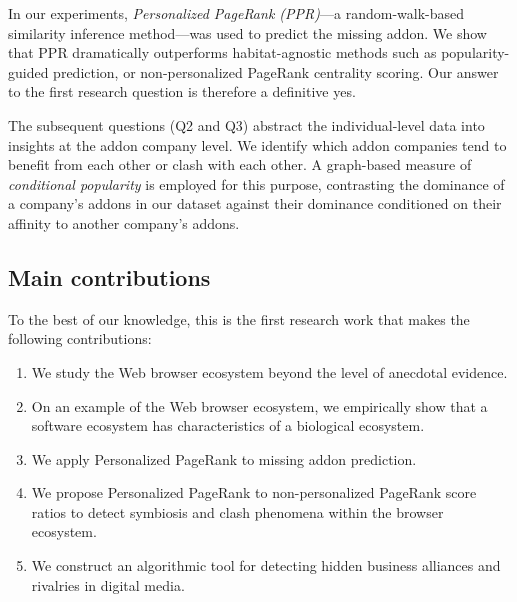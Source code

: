 \documentclass[ijoc,nonblindrev]{informs3} %
\numberwithin{equation}{subsection}
\begin{document}
In our experiments, \emph{Personalized PageRank (PPR)}---a random-walk-based similarity inference method---was used to predict the missing addon. We show that PPR dramatically outperforms habitat-agnostic methods such as popularity-guided prediction, or non-personalized PageRank centrality scoring. Our answer to the first research question is therefore a definitive yes.

The subsequent questions (Q2 and Q3) abstract the individual-level data into insights at the addon company level. We identify which addon companies tend to benefit from each other or clash with each other. A graph-based measure of {\it conditional popularity} is employed for this purpose, contrasting the dominance of a company's addons in our dataset against their dominance conditioned on their affinity to another company's addons.

\subsection{Main contributions}

To the best of our knowledge, this is the first research work that makes the following contributions:
\begin{enumerate}
\item We study the Web browser ecosystem beyond the level of anecdotal evidence.
\item On an example of the Web browser ecosystem, we empirically show that a software ecosystem has characteristics of a biological ecosystem.
\item We apply Personalized PageRank to missing addon prediction.
\item We propose Personalized PageRank to non-personalized PageRank score ratios to detect symbiosis and clash phenomena within the browser ecosystem.
\item We construct an algorithmic tool for detecting hidden business alliances and rivalries in digital media.
\end{enumerate}

\end{document}
